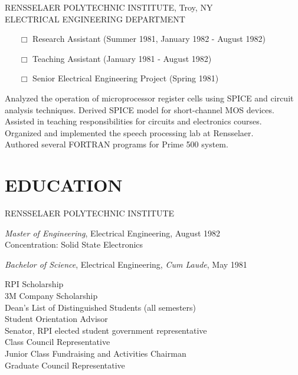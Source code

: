 \begin{resume}
    RENSSELAER POLYTECHNIC INSTITUTE, Troy, NY  \\
    ELECTRICAL ENGINEERING DEPARTMENT 
    \begin{itemize} \itemsep -4pt
    \item[$\Box$]   Research Assistant (Summer 1981, January 1982 - August 
        1982) %
    \item[$\Box$]    Teaching Assistant (January 1981 - August 1982) 
     \item[$\Box$]   Senior Electrical Engineering Project (Spring 1981) 
 \end{itemize}
    Analyzed the operation of microprocessor register cells using 
    SPICE and circuit \\ analysis techniques. Derived SPICE model 
    for short-channel MOS devices. \\
    Assisted in teaching responsibilities for circuits and 
    electronics courses. \\
    Organized and implemented the speech processing lab at 
    Rensselaer. \\
    Authored several FORTRAN programs for Prime 500 system. 
 
\section{EDUCATION} 
    RENSSELAER POLYTECHNIC INSTITUTE 

    {\it Master of Engineering}, Electrical Engineering, August 1982 \\
    Concentration: Solid State Electronics 

    {\it Bachelor of Science}, Electrical Engineering, {\it Cum Laude}, May 
    1981 

    RPI Scholarship  \\
    3M Company Scholarship \\  
    Dean's List of Distinguished Students (all semesters)  \\
    Student Orientation Advisor \\
    Senator, RPI elected student government representative \\
    Class Council Representative \\
    Junior Class Fundraising and Activities Chairman \\
    Graduate Council Representative 
 
\end{resume}







